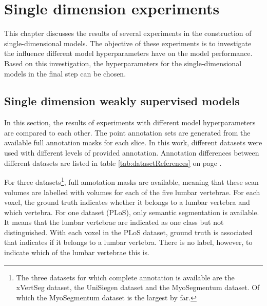 \chapter{Single dimension experiments \label{sec:singleDimension}}\thispagestyle{empty}
\par{
    This chapter discusses the results of several experiments in the construction of single-dimensional models.
    The objective of these experiments is to investigate the influence different model hyperparameters have on the model performance.
    Based on this investigation, the hyperparameters for the single-dimensional models in the final step can be chosen.  
}
\section{Single dimension weakly supervised models}
\par{
    In this section, the results of experiments with different model hyperparameters are compared to each other.
    The point annotation sets are generated from the available full annotation masks for each slice.
    In this work, different datasets were used with different levels of provided annotation. 
    Annotation differences between different datasets are listed in table \ref{tab:datasetReferences} on page \pageref{tab:datasetReferences}.
}
\par{
    For three datasets\footnote{The three datasets for which complete annotation is available are the xVertSeg dataset, the UniSiegen dataset and the MyoSegmentum dataset. Of which the MyoSegmentum dataset is the largest by far.},
    full annotation masks are available, meaning that these scan volumes are labelled with volumes for each of the five lumbar vertebrae.
    For each voxel, the ground truth indicates whether it belongs to a lumbar vertebra and which vertebra.
    For one dataset (PLoS), only semantic segmentation is available. It means that the lumbar vertebrae are indicated as one class but not distinguished. 
    With each voxel in the PLoS dataset, ground truth is associated that indicates if it belongs to a lumbar vertebra. There is no label, however, to indicate which of the lumbar vertebrae this is.
}
